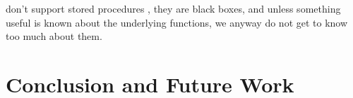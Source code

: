 \documentclass[11pt]{article}
\begin{document}


don't support stored procedures , they are black boxes, and unless something useful is known about the underlying functions, we anyway do not get to know too much about them.



\section{Conclusion and Future Work}	\label{conclude}





\end{document}
